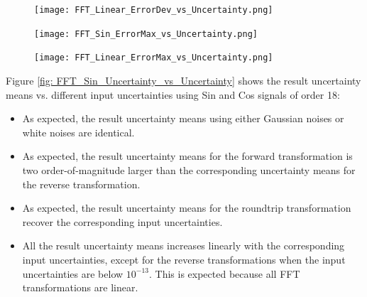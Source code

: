 \documentclass[twoside]{article}
\numberwithin{equation}{section}
\begin{document}
\begin{figure}[p]
\centering
\texttt{[image: FFT\_Linear\_ErrorDev\_vs\_Uncertainty.png]} 
\label{fig: FFT_Linear_ErrorDev_vs_Uncertainty}
\end{figure}

\begin{figure}[p]
\centering
\texttt{[image: FFT\_Sin\_ErrorMax\_vs\_Uncertainty.png]} 
\label{fig: FFT_Sin_ErrorMax_vs_Uncertainty}
\end{figure}

\begin{figure}[p]
\centering
\texttt{[image: FFT\_Linear\_ErrorMax\_vs\_Uncertainty.png]} 
\label{fig: FFT_Linear_ErrorMax_vs_Uncertainty}
\end{figure}


Figure \ref{fig: FFT_Sin_Uncertainty_vs_Uncertainty}  shows the result uncertainty means vs. different input uncertainties using Sin and Cos signals of order 18:
\begin{itemize}
\item As expected, the result uncertainty means using either Gaussian noises or white noises are identical.

\item As expected, the result uncertainty means for the forward transformation is two order-of-magnitude larger than the corresponding uncertainty means for the reverse transformation.

\item As expected, the result uncertainty means for the roundtrip transformation recover the corresponding input uncertainties. 

\item All the result uncertainty means increases linearly with the corresponding input uncertainties, except for the reverse transformations when the input uncertainties are below $10^{-13}$.
This is expected because all FFT transformations are linear.

\end{itemize}
 
\end{document}
